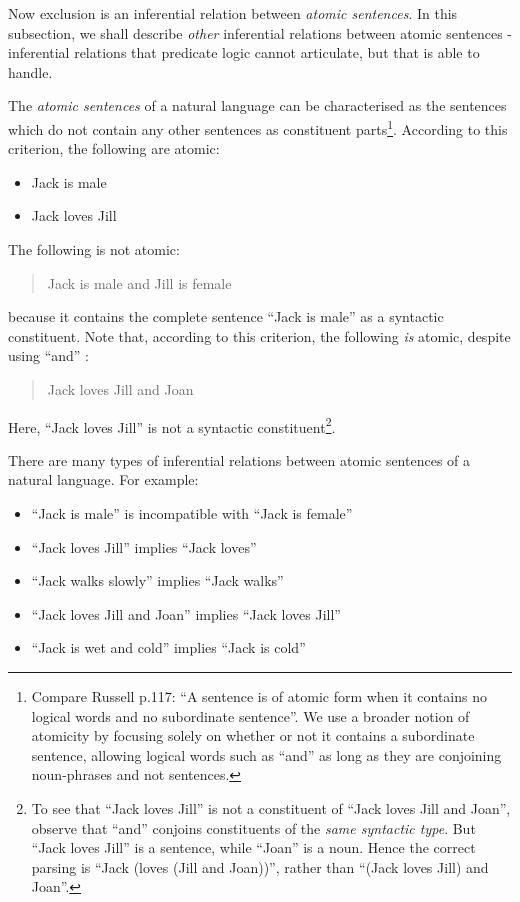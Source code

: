 Now exclusion is an inferential relation between \emph{atomic sentences}. 
In this subsection, we shall describe \emph{other} inferential relations between atomic sentences - inferential relations that predicate logic cannot articulate, but that \ELFULL{} is able to handle.

The \emph{atomic sentences} of a natural language can be
characterised as the sentences which do not contain any other
sentences as constituent parts\footnote{Compare Russell \cite{russell}
  p.117: ``A sentence is of atomic form when it contains no logical
  words and no subordinate sentence''. We use a broader notion of
  atomicity by focusing solely on whether or not it contains a
  subordinate sentence, allowing logical words such as ``and'' as long
  as they are conjoining noun-phrases and not sentences.}.  According
to this criterion, the following are atomic:

\begin{itemize}

\item Jack is male
\item Jack loves Jill
\end{itemize}

\NI The following is not atomic:

\begin{quote}
  Jack is male and Jill is female
\end{quote}

\NI because it contains the complete sentence ``Jack is male'' as a
syntactic constituent.  Note that, according to this criterion, the
following \emph{is} atomic, despite using ``and'' :

\begin{quote}
  Jack loves Jill and Joan
\end{quote}

\NI Here, ``Jack loves Jill'' is not a syntactic constituent\footnote{To see that ``Jack loves Jill'' is not a constituent of ``Jack loves Jill and Joan'', observe that ``and'' conjoins constituents of the \emph{same syntactic type}. But ``Jack loves Jill'' is a sentence, while ``Joan'' is a noun. Hence the correct parsing is ``Jack (loves (Jill and Joan))'', rather than ``(Jack loves Jill) and Joan''.}.

There are many types of inferential relations between atomic
sentences of a natural language.  For example:

\begin{itemize}

\item ``Jack is male'' is incompatible with ``Jack is female''
\item ``Jack loves Jill'' implies ``Jack loves''
\item ``Jack walks slowly'' implies ``Jack walks''
\item ``Jack loves Jill and Joan'' implies ``Jack loves Jill''
\item ``Jack is wet and cold'' implies ``Jack is cold''

\end{itemize}

